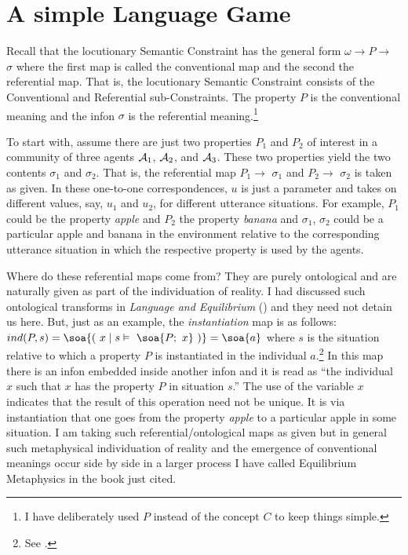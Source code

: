 \section{A simple Language Game} \label{sec:a simple language game}

Recall that the locutionary Semantic Constraint has the general form $\omega \longrightarrow P \longrightarrow$\hspace{-1.1em}\raisebox{1ex}{\scriptsize $u$}\hspace{.55em} $ \sigma$ where the first map is called the conventional map and the second the referential map. That is, the locutionary Semantic Constraint consists of the Conventional and Referential sub-Constraints. The property $P$ is the conventional meaning and the infon $\sigma$ is the referential meaning.\footnote{I have deliberately used $P$ instead of the concept $C$ to keep things simple.}

To start with, assume there are just two properties $P_1$ and $P_2$ of interest in a community of three agents ${\cal A}_1$, ${\cal A}_2$, and ${\cal A}_3$. These two properties yield the two contents $\sigma_1$ and $\sigma_2$. That is, the referential map $P_1 \longrightarrow$\hspace{-1.1em}\raisebox{1ex}{\scriptsize $u$}\hspace{.55em} $ \sigma_1$ and $P_2 \longrightarrow$\hspace{-1.1em}\raisebox{1ex}{\scriptsize $u$}\hspace{.55em} $ \sigma_2$ is taken as given. In these one-to-one correspondences, $u$ is just a parameter and takes on different values, say, $u_1$ and $u_2$, for different utterance situations. For example, $P_1$ could be the property \emph{apple} and $P_2$  the property \emph{banana} and $\sigma_1$, $\sigma_2$ could be a particular apple and banana in the environment relative to the corresponding utterance situation in which the respective property is used by the agents.

Where do these referential maps come from? They are purely ontological and are naturally given as part of the individuation of reality. I had discussed such ontological transforms in \emph{Language and Equilibrium} (\citeyear[Section~2.4]{parikh:le}) and they need not detain us here. But, just as an example, the \emph{instantiation} map is as follows: $ind(P,s) = \soa{(\ x \mid s \vDash\ \soa{P;\ x}\ )} = \soa{a}$ where $s$ is the situation relative to which a property $P$ is instantiated in the individual $a$.\footnote{See .} In this map there is an infon embedded inside another infon and it is read as ``the individual $x$ such that $x$ has the property $P$ in situation $s$.'' The use of the variable $x$ indicates that the result of this operation need not be unique. It is via instantiation that one goes from the property \emph{apple} to a particular apple in some situation. I am taking such referential/ontological maps as given but in general such metaphysical individuation of reality and the emergence of conventional meanings occur side by side in a larger process I have called Equilibrium Metaphysics in the book just cited.

